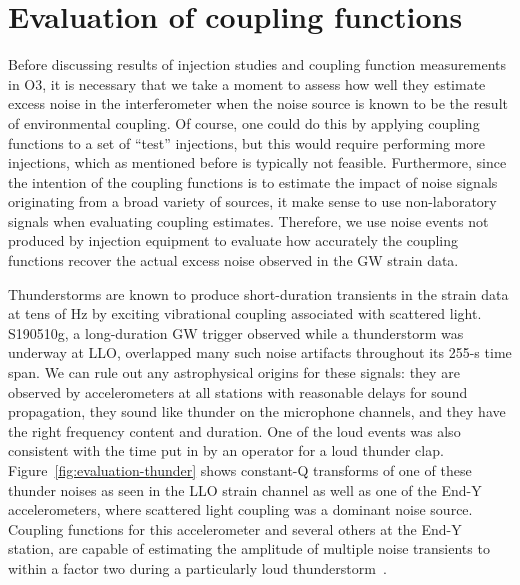 \section{Evaluation of coupling functions}\label{sec:evaluation-of-cf}

Before discussing results of injection studies and coupling function measurements in \ac{O3}, it is necessary that we take a moment to assess how well they estimate excess noise in the interferometer when the noise source is known to be the result of environmental coupling.
Of course, one could do this by applying coupling functions to a set of ``test'' injections, but this would require performing more injections, which as mentioned before is typically not feasible.
Furthermore, since the intention of the coupling functions is to estimate the impact of noise signals originating from a broad variety of sources, it make sense to use non-laboratory signals when evaluating coupling estimates.
Therefore, we use noise events not produced by injection equipment to evaluate how accurately the coupling functions recover the actual excess noise observed in the \ac{GW} strain data.

Thunderstorms are known to produce short-duration transients in the strain data at tens of Hz by exciting vibrational coupling associated with scattered light.
S190510g, a long-duration GW trigger observed while a thunderstorm was underway at LLO, overlapped many such noise artifacts throughout its 255-s time span.
We can rule out any astrophysical origins for these signals: they are observed by accelerometers at all stations with reasonable delays for sound propagation, they sound like thunder on the microphone channels, and they have the right frequency content and duration. One of the loud events was also consistent with the time put in by an operator for a loud thunder clap.
Figure~\ref{fig:evaluation-thunder} shows constant-Q transforms of one of these thunder noises as seen in the LLO strain channel as well as one of the End-Y accelerometers, where scattered light coupling was a dominant noise source.
Coupling functions for this accelerometer and several others at the End-Y station, are capable of estimating the amplitude of multiple noise transients to within a factor two during a particularly loud thunderstorm~\citep{alog_thunder}.

